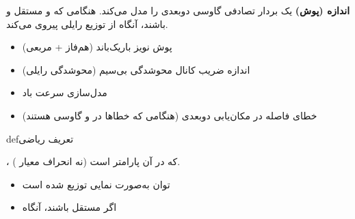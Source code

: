 

\textbf{اندازه (پوش)} یک بردار تصادفی گاوسی دوبعدی را مدل می‌کند. هنگامی که  و  مستقل و  باشند، آنگاه  از توزیع رایلی پیروی می‌کند.


\begin{itemize}
\tightlist
\item
  پوش نویز باریک‌باند (هم‌فاز + مربعی)
\item
  اندازه ضریب کانال محوشدگی بی‌سیم (محوشدگی رایلی)
\item
  مدل‌سازی سرعت باد
\item
  خطای فاصله در مکان‌یابی دوبعدی (هنگامی که خطاها در  و  گاوسی هستند)
\end{itemize}

\begin{PSbox}[unbreakable]{def}{تعریف ریاضی}

، که در آن \lr{$\sigma$} پارامتر است (نه انحراف معیار ).

\end{PSbox}










\begin{itemize}
\tightlist
\item
    توان به‌صورت نمایی توزیع شده است
\item
  اگر  مستقل باشند، آنگاه 
\end{itemize}

